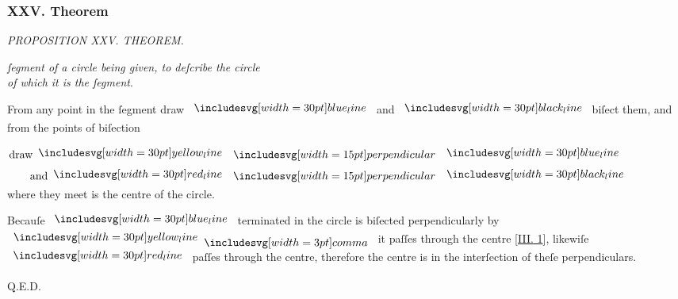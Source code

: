 \documentclass[12pt,preview]{standalone}
\begin{document}
\subsubsection{XXV. Theorem}

\begin{minipage}[t]{0.64\textwidth}
    \vspace{0pt}

    \begin{center}
        \textit{PROPOSITION XXV. THEOREM.}\label{book3pr25} \\
    \end{center}

    \hfill

    \begin{center}
        \raggedright \lettrine[lines=4, loversize=1, nindent=0pt]{}{} \textit{ſegment of a circle being given, to deſcribe the circle\\ of which it is the ſegment}.
    \end{center}

    \hfill

    \hfill

    \hfill

    \raggedright From any point in the ſegment draw $\blueline$ and $\blackline$ biſect them, and from the points of biſection\\

    \hfill

    \begin{center}
        $\begin{aligned}
                \text{draw} \yellowline & \bperp \blueline  \\
                \text{and} \redline     & \bperp \blackline
            \end{aligned}$\\
        where they meet is the centre of the circle.
    \end{center}

    \hfill

    \begin{center}
        Becauſe $\blueline$ terminated in the circle is biſected perpendicularly by $\yellowline \bcomma$ it paſſes through the centre [\hyperref[book3pr1]{\textsc{III.} 1}], likewiſe $\redline$ paſſes through the centre, therefore the centre is in the interſection of theſe perpendiculars.
    \end{center}

    \hfill

    \hfill Q.E.D.
\end{minipage}%
\hfill
\begin{minipage}[t]{0.33\textwidth}
    \vspace{40pt}
    
\end{minipage}%
\end{document}
